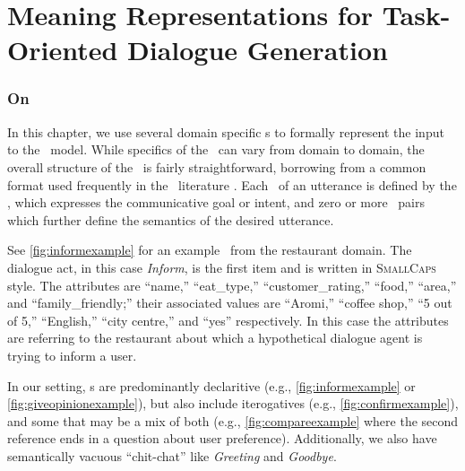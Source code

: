 \section{Meaning Representations for Task-Oriented Dialogue Generation}
\label{sec:mr4tod}
\subsubsection{On \MeaningRepresentations}

In this chapter, we use several domain specific \meaningrepresentation s to
formally represent the input to the \surfacerealization~model.  While
specifics of the \meaningrepresentation~can vary from domain to domain, the
overall structure of the \meaningrepresentation~is fairly straightforward,
borrowing from a common format used frequently in the
\naturallanguagegeneration~literature
\citep{mairesse2010,gasic2014,wen2015,novikova2017,juraska2019}. Each
\meaningrepresentation~of an utterance is defined by the \dialogueact, which
expresses the communicative goal or intent, and zero or more
\attributevalue~pairs which further define the semantics of the desired
utterance. 

See \autoref{fig:informexample} for an example \meaningrepresentation~from
the restaurant domain. The dialogue act, in this case \textit{Inform},
is the first item and is written in \textsc{SmallCaps} style.
The attributes are ``name,'' ``eat\_type,'' ``customer\_rating,'' ``food,'' 
``area,'' and ``family\_friendly;''
their associated values are ``Aromi,'' ``coffee shop,'' ``5 out of 5,'' 
``English,'' ``city centre,'' and ``yes'' respectively. In this
case the attributes are referring to the restaurant about which a hypothetical
dialogue agent is trying to inform a user.

In our setting, \dialogueact s are predominantly declaritive (e.g.,
\autoref{fig:informexample} or \autoref{fig:giveopinionexample}), but also
include iterogatives (e.g., \autoref{fig:confirmexample}), and some that may be
a mix of both (e.g., \autoref{fig:compareexample} where the second reference
ends in a question about user preference).  Additionally, we also have
semantically vacuous ``chit-chat'' like \textit{Greeting} and \textit{Goodbye}.


